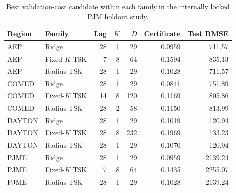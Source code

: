 \begin{table}[htbp]
\centering
\caption{Best validation-cost candidate within each family in the internally locked PJM holdout study.}
\label{tab:pjm_family}
\small
\setlength{\tabcolsep}{4pt}
\begin{tabular}{llrrrrr}
\toprule
Region & Family & Lag & $K$ & $D$ & Certificate & Test RMSE \\
\midrule
AEP & Ridge & 28 & 1 & 29 & 0.0959 & 711.57 \\
AEP & Fixed-$K$ TSK & 7 & 8 & 64 & 0.1594 & 835.13 \\
AEP & Radius TSK & 28 & 1 & 29 & 0.1028 & 711.57 \\
COMED & Ridge & 28 & 1 & 29 & 0.0841 & 751.89 \\
COMED & Fixed-$K$ TSK & 14 & 8 & 120 & 0.1169 & 805.86 \\
COMED & Radius TSK & 28 & 2 & 58 & 0.1150 & 813.99 \\
DAYTON & Ridge & 28 & 1 & 29 & 0.1019 & 120.94 \\
DAYTON & Fixed-$K$ TSK & 28 & 8 & 232 & 0.1969 & 133.23 \\
DAYTON & Radius TSK & 28 & 1 & 29 & 0.1070 & 120.94 \\
PJME & Ridge & 28 & 1 & 29 & 0.0959 & 2139.24 \\
PJME & Fixed-$K$ TSK & 7 & 8 & 64 & 0.1435 & 2255.07 \\
PJME & Radius TSK & 28 & 1 & 29 & 0.1028 & 2139.24 \\
\bottomrule
\end{tabular}
\end{table}
